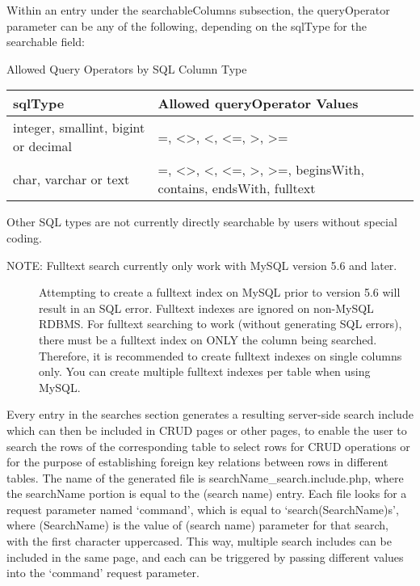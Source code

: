 \documentclass[letterpaper,10pt,english]{sphinxmanual}
\begin{document}
Within an entry under the searchableColumns subsection, the queryOperator parameter can be any of
the following, depending on the sqlType for the searchable field:

Allowed Query Operators by SQL Column Type

\begin{tabulary}{\linewidth}{|L|L|}
\hline
\textbf{
sqlType
} & \textbf{
Allowed queryOperator Values
}\\\hline

integer, smallint, bigint or decimal
 & 
=, \textless{}\textgreater{}, \textless{}, \textless{}=, \textgreater{}, \textgreater{}=
\\\hline

char, varchar or text
 & 
=, \textless{}\textgreater{}, \textless{}, \textless{}=, \textgreater{}, \textgreater{}=, beginsWith, contains, endsWith, fulltext
\\\hline
\end{tabulary}


Other SQL types are not currently directly searchable by users without special coding.
\begin{description}
\item[{NOTE: Fulltext search currently only work with MySQL version 5.6 and later.}] \leavevmode
Attempting to create a fulltext index on MySQL prior to version 5.6 will result in an SQL error.
Fulltext indexes are ignored on non-MySQL RDBMS.
For fulltext searching to work (without generating SQL errors), there must be a fulltext index
on ONLY the column being searched.  Therefore, it is recommended to create fulltext indexes on
single columns only.  You can create multiple fulltext indexes per table when using MySQL.

\end{description}

Every entry in the searches section generates a resulting server-side search include which can then
be included in CRUD pages or other pages, to enable the user to search the rows of the corresponding
table to select rows for CRUD operations or for the purpose of establishing foreign key relations
between rows in different tables.  The name of the generated file is searchName\_search.include.php,
where the searchName portion is equal to the (search name) entry.  Each file looks for a request
parameter named `command', which is equal to `search(SearchName)s', where (SearchName) is the value
of (search name) parameter for that search, with the first character uppercased.  This way, multiple
search includes can be included in the same page, and each can be triggered by passing different
values into the `command' request parameter.
\end{document}
